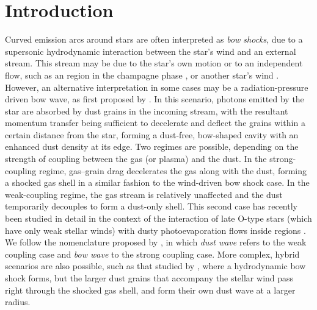 \newcommand\PaperI{\citetalias{Tarango-Yong:2018a}}

\section{Introduction}
\label{sec:introduction}
\newcommand\hii{\ion{H}{ii}}

Curved emission arcs around stars \citep[e.g.,][]{Gull:1979a} are
often interpreted as \textit{bow shocks}, due to a supersonic
hydrodynamic interaction between the star's wind and an external
stream. This stream may be due to the star's own motion or to an
independent flow, such as an \hii{} region in the champagne phase
\citep{Tenorio-Tagle:1979a}, or another star's wind
\citep{Canto:1996}. However, an alternative interpretation in some
cases may be a radiation-pressure driven bow wave, as first proposed
by \citet[\S\textsc{vi}]{van-Buren:1988a}.  In this scenario, photons
emitted by the star are absorbed by dust grains in the incoming
stream, with the resultant momentum transfer being sufficient to
decelerate and deflect the grains within a certain distance from the
star, forming a dust-free, bow-shaped cavity with an enhanced dust
density at its edge.  Two regimes are possible, depending on the
strength of coupling between the gas (or plasma) and the dust.  In the
strong-coupling regime, gas--grain drag decelerates the gas along with
the dust, forming a shocked gas shell in a similar fashion to the
wind-driven bow shock case.  In the weak-coupling regime, the gas
stream is relatively unaffected and the dust temporarily decouples to
form a dust-only shell.  This second case has recently been studied in
detail in the context of the interaction of late O-type stars (which
have only weak stellar winds) with dusty photoevaporation flows inside
\hii{} regions \citep{Ochsendorf:2014a, Ochsendorf:2014b,
  Ochsendorf:2015a}.  We follow the nomenclature proposed by
\citet{Ochsendorf:2014b}, in which \textit{dust wave} refers to the
weak coupling case and \textit{bow wave} to the strong coupling case.
More complex, hybrid scenarios are also possible, such as that studied
by \citet{van-Marle:2011a}, where a hydrodynamic bow shock forms, but
the larger dust grains that accompany the stellar wind pass right
through the shocked gas shell, and form their own dust wave at a
larger radius.

